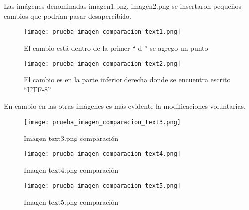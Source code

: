 
Las imágenes denominadas imagen1.png, imagen2.png se insertaron pequeños cambios que podrían pasar desapercibido.

\begin{figure}[H]
    \centering
    {\texttt{[image: prueba\_imagen\_comparacion\_text1.png]}}
    \caption{El cambio está dentro de la primer  “ d ” se agrego un punto}
    \label{img:comparacion_tex1}
\end{figure}
\begin{figure}[H]
    \centering
    {\texttt{[image: prueba\_imagen\_comparacion\_text2.png]}}
    \caption{El cambio es en la parte inferior derecha donde se encuentra escrito “UTF-8”}
    \label{img:comparacion_tex2}
\end{figure}
En cambio en las otras imágenes es más evidente la modificaciones voluntarias.
\begin{figure}[H]
    \centering
    {\texttt{[image: prueba\_imagen\_comparacion\_text3.png]}}
    \caption{Imagen text3.png comparación }
    \label{img:comparacion_tex3}
\end{figure}
\begin{figure}[H]
    \centering
    {\texttt{[image: prueba\_imagen\_comparacion\_text4.png]}}
    \caption{Imagen text4.png comparación }
    \label{img:comparacion_tex4}
\end{figure}
\begin{figure}[H]
    \centering
    {\texttt{[image: prueba\_imagen\_comparacion\_text5.png]}}
    \caption{Imagen text5.png comparación }
    \label{img:comparacion_tex5}
\end{figure}